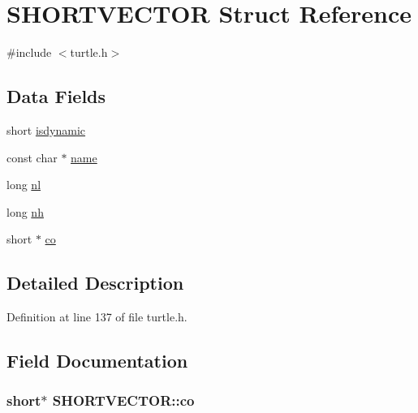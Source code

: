 \hypertarget{struct_s_h_o_r_t_v_e_c_t_o_r}{\section{S\-H\-O\-R\-T\-V\-E\-C\-T\-O\-R Struct Reference}
\label{struct_s_h_o_r_t_v_e_c_t_o_r}
}


{\ttfamily \#include $<$turtle.\-h$>$}

\subsection*{Data Fields}
\begin{DoxyCompactItemize}
\item 
short \hyperlink{struct_s_h_o_r_t_v_e_c_t_o_r_a6261fa9a3ba1332cd672c47835249872}{isdynamic}
\item 
const char $\ast$ \hyperlink{struct_s_h_o_r_t_v_e_c_t_o_r_a45a9e46d84edac7fe157ec909a812057}{name}
\item 
long \hyperlink{struct_s_h_o_r_t_v_e_c_t_o_r_adce8059e01116052c25714f551b7e2c2}{nl}
\item 
long \hyperlink{struct_s_h_o_r_t_v_e_c_t_o_r_afb8a770698bf1400c8d17ccdedd9a696}{nh}
\item 
short $\ast$ \hyperlink{struct_s_h_o_r_t_v_e_c_t_o_r_a1ef146fa6952fbaa6101ced499b19e37}{co}
\end{DoxyCompactItemize}


\subsection{Detailed Description}


Definition at line 137 of file turtle.\-h.



\subsection{Field Documentation}
\hypertarget{struct_s_h_o_r_t_v_e_c_t_o_r_a1ef146fa6952fbaa6101ced499b19e37}{
\subsubsection[{co}]{\setlength{\rightskip}{0pt plus 5cm}short$\ast$ S\-H\-O\-R\-T\-V\-E\-C\-T\-O\-R\-::co}}\label{struct_s_h_o_r_t_v_e_c_t_o_r_a1ef146fa6952fbaa6101ced499b19e37}



